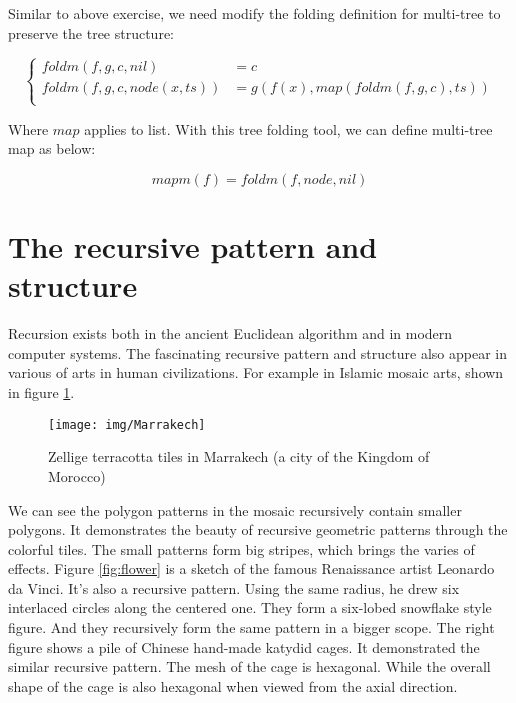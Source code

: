 \documentclass[b5paper]{article}
\begin{document}
\begin{Answer}[ref={ex:recursive-trees}]
{Similar to above exercise, we need modify the folding definition for multi-tree to preserve the tree structure:

\[
\begin{cases}
foldm(f, g, c, nil) & = c \\
foldm(f, g, c, node(x, ts)) & = g(f(x), map(foldm(f, g, c), ts)) \\
\end{cases}
\]

Where $map$ applies to list. With this tree folding tool, we can define multi-tree map as below:

\[
mapm(f) = foldm(f, node, nil)
\]
}
\end{Answer}

\section{The recursive pattern and structure}

Recursion exists both in the ancient Euclidean algorithm and in modern computer systems. The fascinating recursive pattern and structure also appear in various of arts in human civilizations. For example in Islamic mosaic arts, shown in figure \ref{fig:Ceramic-Tile-Tessellations-Marrakech}.

\begin{figure}[htbp]
 \centering
 \texttt{[image: img/Marrakech]}
 \caption{Zellige terracotta tiles in Marrakech (a city of the Kingdom of Morocco)}
 \label{fig:Ceramic-Tile-Tessellations-Marrakech}
\end{figure}

We can see the polygon patterns in the mosaic recursively contain smaller polygons. It demonstrates the beauty of recursive geometric patterns through the colorful tiles. The small patterns form big stripes, which brings the varies of effects. Figure \ref{fig:flower} is a sketch of the famous Renaissance artist Leonardo da Vinci. It's also a recursive pattern. Using the same radius, he drew six interlaced circles along the centered one. They form a six-lobed snowflake style figure. And they recursively form the same pattern in a bigger scope. The right figure shows a pile of Chinese hand-made katydid cages. It demonstrated the similar recursive pattern. The mesh of the cage is hexagonal. While the overall shape of the cage is also hexagonal when viewed from the axial direction.
\end{document}
